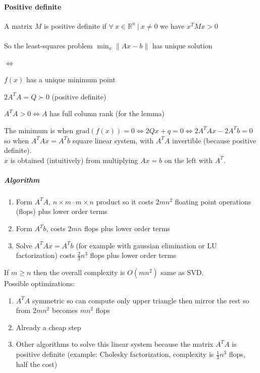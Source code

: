 \documentclass[10pt]{report}
\begin{document}
\paragraph{Positive definite} A matrix $M$ is positive definite if $\forall\:x\in\mathbb{R}^n\:|\:x\neq0$ we have $x^TMx>0$\\\\
So the least-squares problem $\min_x \|Ax-b\|$ has unique solution
\begin{list}{$\Leftrightarrow$}{}
	\item $f(x)$ has a unique minimum point
	\item $2A^TA = Q \succ 0$ (positive definite)
	\item $A^TA > 0 \Leftrightarrow A$ has full column rank (for the lemma)
\end{list}
The minimum is when $\text{grad}(f(x)) = 0 \Leftrightarrow 2Qx + q = 0 \Leftrightarrow 2A^TAx - 2A^Tb = 0$ so when $A^TAx = A^Tb$ square linear system, with $A^TA$ invertible (because positive definite).\\
$x$ is obtained (intuitively) from multiplying $Ax=b$ on the left with $A^T$.
\subparagraph{Algorithm}
\begin{enumerate}
	\item Form $A^TA$, $n\times m\cdot m\times n$ product so it costs $2mn^2$ floating point operations (flops) plus lower order terms
	\item Form $A^Tb$, costs $2mn$ flops plus lower order terms
	\item Solve $A^TAx = A^Tb$ (for example with gaussian elimination or LU factorization) costs $\frac{2}{3}n^3$ flops plus lower order terms
\end{enumerate}
If $m \geq n$ then the overall complexity is $O(mn^2)$ same as SVD.\\
Possible optimizations:
\begin{enumerate}
	\item $A^TA$ symmetric so can compute only upper triangle then mirror the rest so from $2mn^2$ becomes $mn^2$ flops
	\item Already a cheap step
	\item Other algorithms to solve this linear system because the matrix $A^TA$ is positive definite (example: Cholesky factorization, complexity is $\frac{1}{3}n^3$ flops, half the cost)
\end{enumerate}
\end{document}
